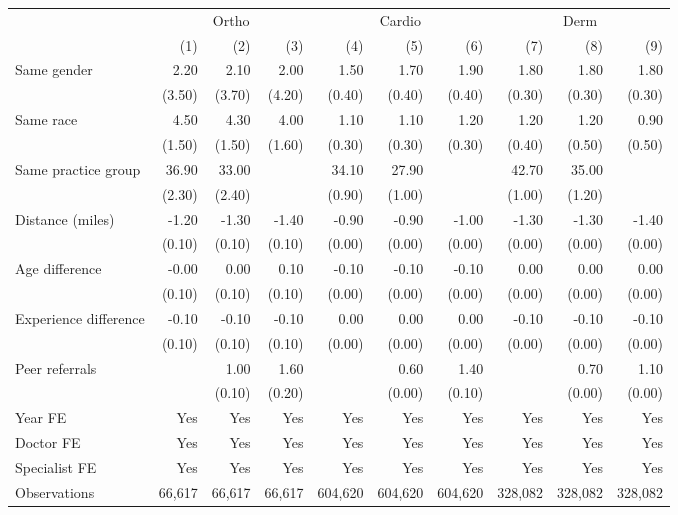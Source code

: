 \begin{tabular}{lrrrrrrrrr}
\toprule
\multicolumn{1}{c}{ } & \multicolumn{3}{c}{Ortho} & \multicolumn{3}{c}{Cardio} & \multicolumn{3}{c}{Derm} \\
\cmidrule(l{3pt}r{3pt}){2-4} \cmidrule(l{3pt}r{3pt}){5-7} \cmidrule(l{3pt}r{3pt}){8-10}
 & (1) & (2) & (3) & (4) & (5) & (6) & (7) & (8) & (9)\\
\midrule
Same gender & 2.20 & 2.10 & 2.00 & 1.50 & 1.70 & 1.90 & 1.80 & 1.80 & 1.80\\
 & (3.50) & (3.70) & (4.20) & (0.40) & (0.40) & (0.40) & (0.30) & (0.30) & (0.30)\\
Same race & 4.50 & 4.30 & 4.00 & 1.10 & 1.10 & 1.20 & 1.20 & 1.20 & 0.90\\
 & (1.50) & (1.50) & (1.60) & (0.30) & (0.30) & (0.30) & (0.40) & (0.50) & (0.50)\\
Same practice group & 36.90 & 33.00 &  & 34.10 & 27.90 &  & 42.70 & 35.00 & \\
 & (2.30) & (2.40) &  & (0.90) & (1.00) &  & (1.00) & (1.20) & \\
Distance (miles) & -1.20 & -1.30 & -1.40 & -0.90 & -0.90 & -1.00 & -1.30 & -1.30 & -1.40\\
 & (0.10) & (0.10) & (0.10) & (0.00) & (0.00) & (0.00) & (0.00) & (0.00) & (0.00)\\
Age difference & -0.00 & 0.00 & 0.10 & -0.10 & -0.10 & -0.10 & 0.00 & 0.00 & 0.00\\
 & (0.10) & (0.10) & (0.10) & (0.00) & (0.00) & (0.00) & (0.00) & (0.00) & (0.00)\\
Experience difference & -0.10 & -0.10 & -0.10 & 0.00 & 0.00 & 0.00 & -0.10 & -0.10 & -0.10\\
 & (0.10) & (0.10) & (0.10) & (0.00) & (0.00) & (0.00) & (0.00) & (0.00) & (0.00)\\
Peer referrals &  & 1.00 & 1.60 &  & 0.60 & 1.40 &  & 0.70 & 1.10\\
 &  & (0.10) & (0.20) &  & (0.00) & (0.10) &  & (0.00) & (0.00)\\
Year FE & Yes & Yes & Yes & Yes & Yes & Yes & Yes & Yes & Yes\\
Doctor FE & Yes & Yes & Yes & Yes & Yes & Yes & Yes & Yes & Yes\\
Specialist FE & Yes & Yes & Yes & Yes & Yes & Yes & Yes & Yes & Yes\\
Observations & 66,617 & 66,617 & 66,617 & 604,620 & 604,620 & 604,620 & 328,082 & 328,082 & 328,082\\
\bottomrule
\end{tabular}
